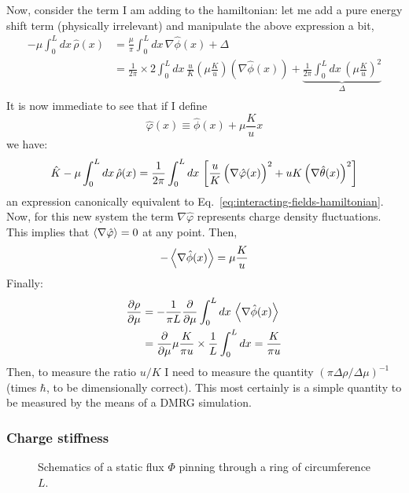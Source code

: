 Now, consider the term I am adding to the hamiltonian: let me add a pure energy shift term (physically irrelevant) and manipulate the above expression a bit,
\[
\begin{aligned}
	- \mu \int_0^L dx \, \hat \rho(x) &= \frac{\mu}{\pi} \int_0^L dx \, \nabla \hat \phi(x) + \Delta \\
	&= \frac{1}{2\pi} \times 2 \int_0^L dx \, \frac{u}{K} \left( \mu \frac{K}{u} \right) \left( \nabla \hat \phi(x) \right) + \underbrace{
		\frac{1}{2\pi} \int_0^L dx \, \left( \mu \frac{K}{u} \right)^2
	}_{\Delta} \\
\end{aligned}	
\]
It is now immediate to see that if I define
\[
	\hat \varphi(x) \equiv \hat \phi(x) + \mu \frac{K}{u} x
\]
we have:
\[
	\hat K - \mu \int_0^L dx \, \hat \rho(x) =  \frac{1}{2\pi} \int_0^L dx \, \left[ \frac{u}{K} \left( \vphantom{\hat\theta} \nabla \hat \varphi(x) \right)^2 + uK \left( \nabla \hat \theta(x) \right)^2 \right]
\]
an expression canonically equivalent to Eq.~\eqref{eq:interacting-fields-hamiltonian}. Now, for this new system the term $\nabla \hat \varphi$ represents charge density fluctuations. This implies that $\ev{\nabla \hat \varphi} = 0$ at any point. Then,
\[
	- \ev{\nabla \hat \phi(x)} = \mu \frac{K}{u}
\]
Finally:
\begin{equation}
	\begin{aligned}
		\pdv{\rho}{\mu}	&= - \frac{1}{\pi L} \pdv{}{\mu} \int_0^L dx \, \ev{\nabla \hat \phi(x)} \\
		&= \pdv{}{\mu} \mu \frac{K}{\pi u} \times \frac{1}{L} \int_0^L dx = \frac{K}{\pi u} \label{eq:charge-compressibility}
	\end{aligned}
\end{equation}
Then, to measure the ratio $u/K$ I need to measure the quantity $(\pi \Delta \rho / \Delta \mu)^{-1}$ (times $\hbar$, to be dimensionally correct). This most certainly is a simple quantity to be measured by the means of a DMRG simulation.

\subsubsection{Charge stiffness}

\begin{figure}
	\centering
	
	\caption{Schematics of a static flux $\Phi$ pinning through a ring of circumference $L$.}
	\label{fig:flux-through-ring}
\end{figure}

